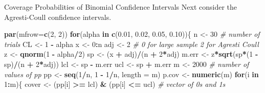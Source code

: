 \documentclass[
  ignorenonframetext,
]{beamer}
\newenvironment{Shaded}{\begin{snugshade}}{\end{snugshade}}
\newcommand{\AttributeTok}[1]{\textcolor[rgb]{0.13,0.29,0.53}{#1}}
\newcommand{\CommentTok}[1]{\textcolor[rgb]{0.56,0.35,0.01}{\textit{#1}}}
\newcommand{\ControlFlowTok}[1]{\textcolor[rgb]{0.13,0.29,0.53}{\textbf{#1}}}
\newcommand{\DecValTok}[1]{\textcolor[rgb]{0.00,0.00,0.81}{#1}}
\newcommand{\FloatTok}[1]{\textcolor[rgb]{0.00,0.00,0.81}{#1}}
\newcommand{\FunctionTok}[1]{\textcolor[rgb]{0.13,0.29,0.53}{\textbf{#1}}}
\newcommand{\NormalTok}[1]{#1}
\newcommand{\OtherTok}[1]{\textcolor[rgb]{0.56,0.35,0.01}{#1}}
\newcommand{\SpecialCharTok}[1]{\textcolor[rgb]{0.81,0.36,0.00}{\textbf{#1}}}
\begin{document}
\begin{frame}[fragile]{Coverage Probabilities of Binomial Confidence
Intervals}
\protect\hypertarget{coverage-probabilities-of-binomial-confidence-intervals-7}{}
Next consider the Agresti-Coull confidence intervals.

\tiny

\begin{Shaded}
\begin{Highlighting}[]
\FunctionTok{par}\NormalTok{(}\AttributeTok{mfrow=}\FunctionTok{c}\NormalTok{(}\DecValTok{2}\NormalTok{, }\DecValTok{2}\NormalTok{))}
\ControlFlowTok{for}\NormalTok{(alpha }\ControlFlowTok{in} \FunctionTok{c}\NormalTok{(}\FloatTok{0.01}\NormalTok{, }\FloatTok{0.02}\NormalTok{, }\FloatTok{0.05}\NormalTok{, }\FloatTok{0.10}\NormalTok{))\{}
\NormalTok{n }\OtherTok{\textless{}{-}} \DecValTok{30}     \CommentTok{\# number of trials}
\NormalTok{CL }\OtherTok{\textless{}{-}} \DecValTok{1} \SpecialCharTok{{-}}\NormalTok{ alpha}
\NormalTok{x }\OtherTok{\textless{}{-}} \DecValTok{0}\SpecialCharTok{:}\NormalTok{n }
\NormalTok{adj }\OtherTok{\textless{}{-}} \DecValTok{2}  \CommentTok{\# 0 for large sample 2 for Agresti Coull}
\NormalTok{z }\OtherTok{\textless{}{-}} \FunctionTok{qnorm}\NormalTok{(}\DecValTok{1} \SpecialCharTok{{-}}\NormalTok{ alpha}\SpecialCharTok{/}\DecValTok{2}\NormalTok{)}
\NormalTok{sp }\OtherTok{\textless{}{-}}\NormalTok{ (x }\SpecialCharTok{+}\NormalTok{ adj)}\SpecialCharTok{/}\NormalTok{(n }\SpecialCharTok{+} \DecValTok{2}\SpecialCharTok{*}\NormalTok{adj)}
\NormalTok{m.err }\OtherTok{\textless{}{-}}\NormalTok{ z}\SpecialCharTok{*}\FunctionTok{sqrt}\NormalTok{(sp}\SpecialCharTok{*}\NormalTok{(}\DecValTok{1} \SpecialCharTok{{-}}\NormalTok{ sp)}\SpecialCharTok{/}\NormalTok{(n }\SpecialCharTok{+} \DecValTok{2}\SpecialCharTok{*}\NormalTok{adj))}
\NormalTok{lcl }\OtherTok{\textless{}{-}}\NormalTok{ sp }\SpecialCharTok{{-}}\NormalTok{ m.err}
\NormalTok{ucl }\OtherTok{\textless{}{-}}\NormalTok{ sp }\SpecialCharTok{+}\NormalTok{ m.err}
\NormalTok{m }\OtherTok{\textless{}{-}} \DecValTok{2000} \CommentTok{\# number of values of pp}
\NormalTok{pp }\OtherTok{\textless{}{-}} \FunctionTok{seq}\NormalTok{(}\DecValTok{1}\SpecialCharTok{/}\NormalTok{n, }\DecValTok{1} \SpecialCharTok{{-}} \DecValTok{1}\SpecialCharTok{/}\NormalTok{n, }\AttributeTok{length =}\NormalTok{ m)}
\NormalTok{p.cov }\OtherTok{\textless{}{-}} \FunctionTok{numeric}\NormalTok{(m)}
\ControlFlowTok{for}\NormalTok{(i }\ControlFlowTok{in} \DecValTok{1}\SpecialCharTok{:}\NormalTok{m)\{}
\NormalTok{  cover }\OtherTok{\textless{}{-}}\NormalTok{ (pp[i] }\SpecialCharTok{\textgreater{}=}\NormalTok{ lcl) }\SpecialCharTok{\&}\NormalTok{ (pp[i] }\SpecialCharTok{\textless{}=}\NormalTok{ ucl)  }\CommentTok{\# vector of 0s and 1s}

\end{Highlighting}
\end{Shaded}
\end{frame}
\end{document}
